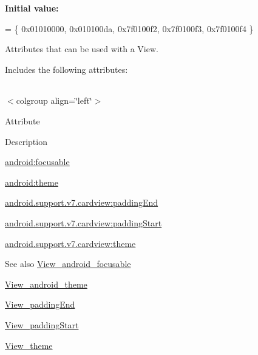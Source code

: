 {\bfseries Initial value\+:}
\begin{DoxyCode}
= \{
            0x01010000, 0x010100da, 0x7f0100f2, 0x7f0100f3,
            0x7f0100f4
        \}
\end{DoxyCode}
Attributes that can be used with a View. 

Includes the following attributes\+:

\tabulinesep=1mm
\begin{longtabu} spread 0pt [c]{*{0}{|X[-1]}|}
\hline
\end{longtabu}
$<$colgroup align=\char`\"{}left\char`\"{}$>$ 

Attribute

Description 

{\ttfamily \hyperlink{classandroid_1_1support_1_1v7_1_1cardview_1_1R_1_1styleable_adb41a8189c196a759dc62ea614f6ff17}{android\+:focusable}}

{\ttfamily \hyperlink{classandroid_1_1support_1_1v7_1_1cardview_1_1R_1_1styleable_a977968b5162426b04e4c0f785248e889}{android\+:theme}}

{\ttfamily \hyperlink{classandroid_1_1support_1_1v7_1_1cardview_1_1R_1_1styleable_ac75d4392262bd8cc266e0e0f62558b0a}{android.\+support.\+v7.\+cardview\+:padding\+End}}

{\ttfamily \hyperlink{classandroid_1_1support_1_1v7_1_1cardview_1_1R_1_1styleable_af3ab4c9945e99c8800d0a26c042be3e5}{android.\+support.\+v7.\+cardview\+:padding\+Start}}

{\ttfamily \hyperlink{classandroid_1_1support_1_1v7_1_1cardview_1_1R_1_1styleable_a7152ff8c1f1b8c910d28540824081033}{android.\+support.\+v7.\+cardview\+:theme}}

\begin{DoxySeeAlso}{See also}
\hyperlink{classandroid_1_1support_1_1v7_1_1cardview_1_1R_1_1styleable_adb41a8189c196a759dc62ea614f6ff17}{View\+\_\+android\+\_\+focusable} 

\hyperlink{classandroid_1_1support_1_1v7_1_1cardview_1_1R_1_1styleable_a977968b5162426b04e4c0f785248e889}{View\+\_\+android\+\_\+theme} 

\hyperlink{classandroid_1_1support_1_1v7_1_1cardview_1_1R_1_1styleable_ac75d4392262bd8cc266e0e0f62558b0a}{View\+\_\+padding\+End} 

\hyperlink{classandroid_1_1support_1_1v7_1_1cardview_1_1R_1_1styleable_af3ab4c9945e99c8800d0a26c042be3e5}{View\+\_\+padding\+Start} 

\hyperlink{classandroid_1_1support_1_1v7_1_1cardview_1_1R_1_1styleable_a7152ff8c1f1b8c910d28540824081033}{View\+\_\+theme} 
\end{DoxySeeAlso}
\mbox{\label{classandroid_1_1support_1_1v7_1_1cardview_1_1R_1_1styleable_adb41a8189c196a759dc62ea614f6ff17}} 
